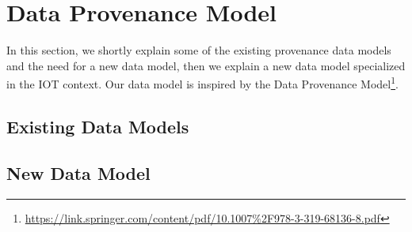 \section{Data Provenance Model}
In this section, we shortly explain some of the existing provenance data models and the need for a new data model, then we explain a new data model specialized in the IOT context. Our data model is inspired by the Data Provenance Model\footnote{\url{https://link.springer.com/content/pdf/10.1007\%2F978-3-319-68136-8.pdf}}.


\subsection{Existing Data Models}

\subsection{New Data Model}

